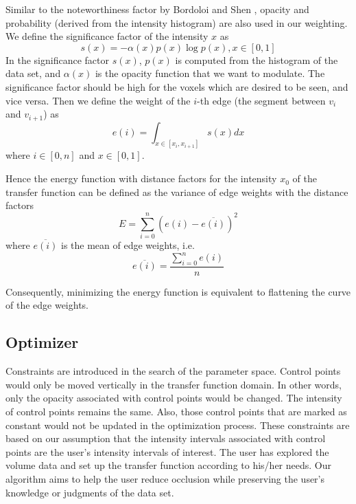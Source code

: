 Similar to the noteworthiness factor by Bordoloi and Shen \cite{bordoloi_view_2005}, opacity and probability (derived from the intensity histogram) are also used in our weighting.
We define the significance factor of the intensity $ x $ as
\[
s(x)=-\alpha(x)p(x) \log p(x), x \in [0,1]
\]
In the significance factor $ s(x)$, $ p(x) $ is computed from the histogram of the data set, and $ \alpha(x) $ is the opacity function that we want to modulate.
The significance factor should be high for the voxels which are desired to be seen, and vice versa.
Then we define the weight of the $ i $-th edge (the segment between $ v_{i} $ and $ v_{i+1} $) as
\[
e(i)=\int_{x \in [x_{i}, x_{i+1}]} s(x) dx
\]
where $ i \in [0,n]$ and $ x \in [0,1] $.

Hence the energy function with distance factors for the intensity $ x_{0} $ of the transfer function can be defined as the variance of edge weights with the distance factors
\[
E=\sum_{i=0}^{n}(e(i)-\overline{e(i)})^{2}
\]
where $ \overline{e(i)} $ is the mean of edge weights, i.e.
\[
\overline{e(i)}= \frac{\sum_{i=0}^{n}e(i)}{n}
\]
%

Consequently, minimizing the energy function is equivalent to flattening the curve of the edge weights.

\subsection{Optimizer}
\label{sec:optimizer}
Constraints are introduced in the search of the parameter space. Control points would only be moved vertically in the transfer function domain. In other words, only the opacity associated with control points would be changed. The intensity of control points remains the same. Also, those control points that are marked as constant would not be updated in the optimization process.
These constraints are based on our assumption that the intensity intervals associated with control points are the user's intensity intervals of interest. The user has explored the volume data and set up the transfer function according to his/her needs. Our algorithm aims to help the user reduce occlusion while preserving the user's knowledge or judgments of the data set.

